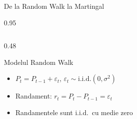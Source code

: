 \documentclass[9pt, aspectratio=169, t]{beamer}
\begin{document}
\begin{frame}{De la Random Walk la Martingal}
\begin{cminipage}{0.95\textwidth}
    \begin{columns}[T]
        \begin{column}{0.48\textwidth}
            \begin{block}{Modelul Random Walk}
            \begin{itemize}\setlength{\itemsep}{0pt}
                \item $P_t = P_{t-1} + \varepsilon_t$, \; $\varepsilon_t \sim \text{i.i.d.}(0, \sigma^2)$
                \item Randament: $r_t = P_t - P_{t-1} = \varepsilon_t$
                \item Randamentele sunt i.i.d.\ cu medie zero
            \end{itemize}
            \end{block}


\end{column}
\end{columns}
\end{cminipage}
\end{frame}
\end{document}
